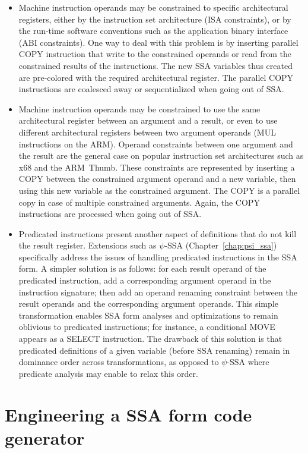 \begin{itemize}
\item Machine instruction operands may be constrained to specific architectural
registers, either by the instruction set architecture (ISA constraints), or by
the run-time software conventions such as the application binary interface (ABI
constraints). One way to deal with this problem is by inserting parallel COPY
instruction that write to the constrained operands or read from the constrained
results of the instructions. The new SSA variables thus created are pre-colored
with the required architectural register. The parallel COPY instructions are
coalesced away or sequentialized when going out of SSA.

\item Machine instruction operands may be constrained to use the same
architectural register between an argument and a result, or even to use
different architectural registers between two argument operands (MUL
instructions on the ARM). Operand constraints between one argument and the
result are the general case on popular instruction set architectures such as
x68 and the ARM~Thumb. These constraints are represented by inserting a COPY
between the constrained argument operand and a new variable, then using this new
variable as the constrained argument. The COPY is a parallel copy in case of
multiple constrained arguments. Again, the COPY instructions are processed when
going out of SSA.

\item Predicated instructions present another aspect of definitions that do not
kill the result register. Extensions such as $\psi$-SSA
(Chapter~\ref{chap:psi_ssa}) specifically address the issues of handling
predicated instructions in the SSA form. A simpler solution is as follows: for
each result operand of the predicated instruction, add a corresponding argument
operand in the instruction signature; then add an operand renaming constraint
between the result operands and the corresponding argument operands. This simple
transformation enables SSA form analyses and optimizations to remain oblivious
to predicated instructions; for instance, a conditional MOVE appears as a SELECT
instruction. The drawback of this solution is that predicated definitions of a
given variable (before SSA renaming) remain in dominance order across
transformations, as opposed to $\psi$-SSA where predicate analysis may enable to
relax this order.

\end{itemize}


\section{Engineering a SSA form code generator}

